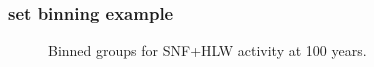 \begin{frame}
  \frametitle{\Gls{set} binning example}
        
  \begin{figure}[htbp!]
    \begin{center}
      \resizebox{0.65\columnwidth}{!}{}
    \end{center}
          \caption{Binned groups for SNF+HLW activity at 100 years.}
    \label{fig:set_activity_bins}
  \end{figure}
\end{frame}